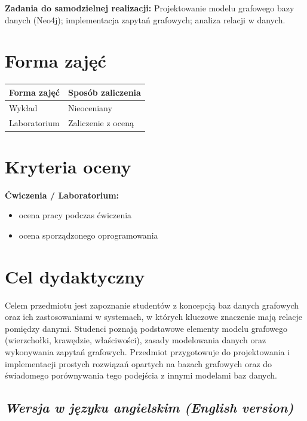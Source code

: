 \documentclass[12pt, a4paper]{article}
\newcommand{\thdrule}{\noalign{\global\setlength{\extrarowheight}{0pt}}}
\newcommand{\thdend}{\noalign{\global\setlength{\extrarowheight}{3pt}}}
\begin{document}
\vspace{4pt}
\noindent\textbf{Zadania do samodzielnej realizacji:} Projektowanie modelu grafowego bazy danych (Neo4j); implementacja zapytań grafowych; analiza relacji w danych.

\section{Forma zajęć}

\begin{center}
{\scriptsize
\begin{tabular}{m{5cm}m{8cm}}
\thdrule\toprule
\rowcolor{pjatkRed} {\color{white}\textbf{Forma zajęć}} & {\color{white}\textbf{Sposób zaliczenia}} \\
\midrule\thdend
  \rowcolor{tableRowLight} Wykład & Nieoceniany \\
  \rowcolor{tableRowAlt} Laboratorium & Zaliczenie z oceną \\
\bottomrule
\end{tabular}}
\end{center}

\section{Kryteria oceny}

\textbf{Ćwiczenia / Laboratorium:}
\begin{itemize}
  \item ocena pracy podczas ćwiczenia
  \item ocena sporządzonego oprogramowania
\end{itemize}


\section{Cel dydaktyczny}

Celem przedmiotu jest zapoznanie studentów z koncepcją baz danych grafowych oraz ich zastosowaniami w systemach, w których kluczowe znaczenie mają relacje pomiędzy danymi. Studenci poznają podstawowe elementy modelu grafowego (wierzchołki, krawędzie, właściwości), zasady modelowania danych oraz wykonywania zapytań grafowych. Przedmiot przygotowuje do projektowania i implementacji prostych rozwiązań opartych na bazach grafowych oraz do świadomego porównywania tego podejścia z innymi modelami baz danych.

\subsection*{\textit{Wersja w języku angielskim (English version)}}
\end{document}
